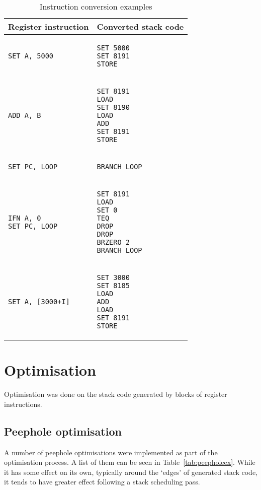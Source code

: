 \begin{table}
\caption{Instruction conversion examples}
\begin{tabular}{l l}\label{tab:conversionexs}
Register instruction & Converted stack code \\ \toprule
\begin{lstlisting}
SET A, 5000
\end{lstlisting} &
\begin{lstlisting}
SET 5000
SET 8191
STORE
\end{lstlisting} \\ \midrule
\begin{lstlisting}
ADD A, B
\end{lstlisting} &
\begin{lstlisting}
SET 8191
LOAD
SET 8190
LOAD
ADD
SET 8191
STORE
\end{lstlisting} \\ \midrule
\begin{lstlisting}
SET PC, LOOP
\end{lstlisting} &
\begin{lstlisting}
BRANCH LOOP
\end{lstlisting} \\ \midrule
\begin{lstlisting}
IFN A, 0
SET PC, LOOP
\end{lstlisting} &
\begin{lstlisting}
SET 8191
LOAD
SET 0
TEQ
DROP
DROP
BRZERO 2
BRANCH LOOP
\end{lstlisting} \\ \midrule
\begin{lstlisting}
SET A, [3000+I]
\end{lstlisting} &
\begin{lstlisting}
SET 3000
SET 8185
LOAD
ADD
LOAD
SET 8191
STORE
\end{lstlisting} \\
\end{tabular}
\end{table}


\section{Optimisation}
Optimisation was done on the stack code generated by blocks of register
instructions.

\subsection{Peephole optimisation}
A number of peephole optimisations were implemented as part of the optimisation
process. A list of them can be seen in Table~\ref{tab:peepholeex}. While it has
some effect on its own, typically around the `edges' of generated stack
code, it tends to have greater effect following a stack scheduling pass.

